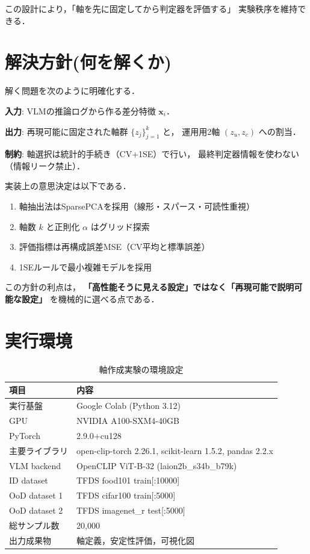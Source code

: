 \documentclass[11pt,a4paper]{article}
\begin{document}
この設計により，「軸を先に固定してから判定器を評価する」
実験秩序を維持できる．

\section{解決方針(何を解くか)}
解く問題を次のように明確化する．

\textbf{入力}: VLMの推論ログから作る差分特徴 $\mathbf{x}_i$．

\textbf{出力}: 再現可能に固定された軸群 $\{z_j\}_{j=1}^{k}$ と，
運用用2軸 $(z_u,z_c)$ への割当．

\textbf{制約}: 軸選択は統計的手続き（CV+1SE）で行い，
最終判定器情報を使わない（情報リーク禁止）．

実装上の意思決定は以下である．
\begin{enumerate}
  \item 軸抽出法はSparsePCAを採用（線形・スパース・可読性重視）
  \item 軸数 $k$ と正則化 $\alpha$ はグリッド探索
  \item 評価指標は再構成誤差MSE（CV平均と標準誤差）
  \item 1SEルールで最小複雑モデルを採用
\end{enumerate}

この方針の利点は，
\textbf{「高性能そうに見える設定」ではなく「再現可能で説明可能な設定」}
を機械的に選べる点である．

\section{実行環境}
\begin{table}[H]
\centering
\begin{tabular}{ll}
\toprule
項目 & 内容 \\
\midrule
実行基盤 & Google Colab (Python 3.12) \\
GPU & NVIDIA A100-SXM4-40GB \\
PyTorch & 2.9.0+cu128 \\
主要ライブラリ & open-clip-torch 2.26.1, scikit-learn 1.5.2, pandas 2.2.x \\
VLM backend & OpenCLIP ViT-B-32 (laion2b\_s34b\_b79k) \\
ID dataset & TFDS food101 train[:10000] \\
OoD dataset 1 & TFDS cifar100 train[:5000] \\
OoD dataset 2 & TFDS imagenet\_r test[:5000] \\
総サンプル数 & 20,000 \\
出力成果物 & 軸定義，安定性評価，可視化図 \\
\bottomrule
\end{tabular}
\caption{軸作成実験の環境設定}
\label{tab:env}
\end{table}
\end{document}
